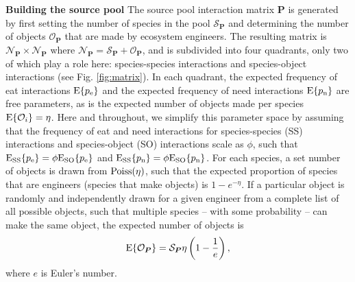 \documentclass[twocolumn,preprintnumbers,amsmath,amssymb,superscriptaddress]{revtex4}
\newcommand{\rr}[1]{{\rm #1}}
\begin{document}
\textbf{Building the source pool} The source pool interaction matrix $\bm P$ is generated by first setting the number of species in the pool $\mathcal{S}_{\bm P}$ and determining the number of objects $\mathcal{O}_{\bm P}$ that are made by ecosystem engineers.
The resulting matrix is $\mathcal{N}_{\bm P}\times\mathcal{N}_{\bm P}$ where $\mathcal{N}_{\bm P}=\mathcal{S}_{\bm P}+\mathcal{O}_{\bm P}$, and is subdivided into four quadrants, only two of which play a role here: species-species interactions and species-object interactions (see Fig. \ref{fig:matrix}).
In each quadrant, the expected frequency of eat interactions ${\rm E}\{p_\rr{e}\}$ and the expected frequency of need interactions ${\rm E}\{p_\rr{n}\}$ are free parameters, as is the expected number of objects made per species ${\rm E}\{\mathcal{O}_i\}=\eta$.
Here and throughout, we simplify this parameter space by assuming that the frequency of eat and need interactions for species-species (SS) interactions and species-object (SO) interactions scale as $\phi$, such that ${\rm E_{SS}}\{p_\rr{e}\} = \phi{\rm E_{SO}}\{p_\rr{e}\}$ and ${\rm E_{SS}}\{p_\rr{n}\} = \phi{\rm E_{SO}}\{p_\rr{n}\}$.
For each species, a set number of objects is drawn from ${\rm Poiss}(\eta)$, such that the expected proportion of species that are engineers (species that make objects) is $1-{e}^{-\eta}$. 
If a particular object is randomly and independently drawn for a given engineer from a complete list of all possible objects, such that multiple species -- with some probability -- can make the same object, the expected number of objects is
\begin{equation}
{\rm E}\{\mathcal{O}_{\bm P}\} = \mathcal{S}_{\bm P}\eta\left(1 - \frac{1}{{e}}\right),
\end{equation}
where $e$ is Euler's number.
\end{document}
